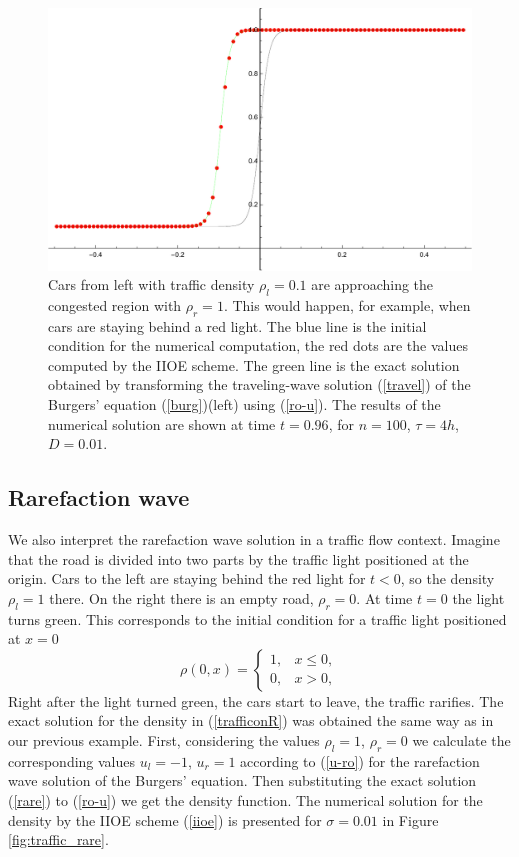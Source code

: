 \documentclass[../include.tex]{subfiles}
\begin{document}
\begin{figure}[h!]
	\centering
	\includegraphics[width=.5\textwidth]{figures/trafficTravel100t.96}
	\caption{Cars from left with traffic density $ \rho_l = 0.1 $ are approaching the congested region with $ \rho_r = 1 $. This would happen, for example, when cars are staying behind a red light. 
		The blue line is the initial condition for the numerical computation, the red dots are the values computed by the IIOE scheme. The green line is the exact solution obtained by transforming the traveling-wave solution {\rm (\ref{travel})} of the Burgers' equation {\rm (\ref{burg})}(left) using {\rm (\ref{ro-u})}. The results of the numerical solution are shown at time $ t = 0.96 $, for $ n = 100 $, $ \tau = 4h $, $ D = 0.01 $.
	}
	\label{fig:traffic_travel}
\end{figure}

\newpage
\subsection{Rarefaction wave}
We also interpret the rarefaction wave solution in a traffic flow context. Imagine that the road is divided into two parts by the traffic light positioned at the origin. Cars to the left are staying behind the red light for $ t<0 $, so the density $ \rho_l = 1 $ there. On the right there is an empty road, $ \rho_r = 0 $. At time $ t = 0 $ the light turns green. This corresponds to the initial condition for a traffic light positioned at $ x = 0 $
\begin{equation}
	\rho(0,x) =
	\begin{cases}
		1, &x\leq 0,\nonumber\\
		0, &x>0,\nonumber
	\end{cases}
\end{equation}
Right after the light turned green, the cars start to leave, the traffic rarifies. The exact solution for the density in (\ref{trafficonR}) was obtained the same way as in our previous example. First, considering the values $ \rho_l = 1 $, $ \rho_r = 0 $ we calculate the corresponding values $ u_l = -1 $, $ u_r = 1 $ according to (\ref{u-ro}) for the rarefaction wave solution of the Burgers' equation. Then substituting the exact solution (\ref{rare}) to (\ref{ro-u}) we get the density function. The numerical solution for the density by the IIOE scheme (\ref{iioe}) is presented for $ \sigma = 0.01 $ in Figure \ref{fig:traffic_rare}.
\end{document}
